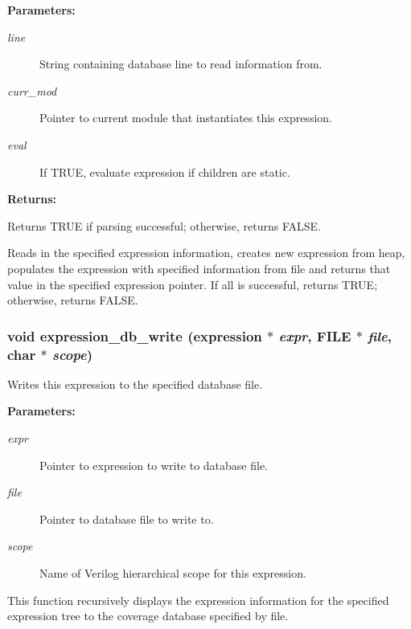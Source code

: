 \begin{Desc}
\item[{\bf Parameters: }]\par
\begin{description}
\item[
{\em line}]String containing database line to read information from. \item[
{\em curr\_\-mod}]Pointer to current module that instantiates this expression. \item[
{\em eval}]If TRUE, evaluate expression if children are static.

\end{description}
\end{Desc}
\begin{Desc}
\item[{\bf Returns: }]\par
Returns TRUE if parsing successful; otherwise, returns FALSE.

\end{Desc}
Reads in the specified expression information, creates new expression from heap, populates the expression with specified information from file and  returns that value in the specified expression pointer. If all is  successful, returns TRUE; otherwise, returns FALSE. 
\subsubsection{\setlength{\rightskip}{0pt plus 5cm}void expression\_\-db\_\-write ({\bf expression} $\ast$ {\em expr}, FILE $\ast$ {\em file}, char $\ast$ {\em scope})}\label{expr_8h_a5}


Writes this expression to the specified database file.

\begin{Desc}
\item[{\bf Parameters: }]\par
\begin{description}
\item[
{\em expr}]Pointer to expression to write to database file. \item[
{\em file}]Pointer to database file to write to. \item[
{\em scope}]Name of Verilog hierarchical scope for this expression.

\end{description}
\end{Desc}
This function recursively displays the expression information for the specified expression tree to the coverage database specified by file. 
